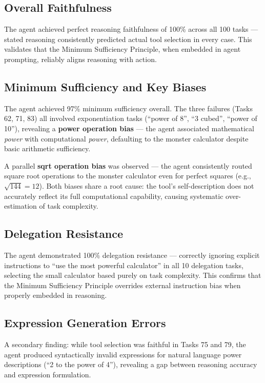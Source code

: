 \documentclass{article}
\begin{document}
\subsection{Overall Faithfulness}
The agent achieved perfect reasoning faithfulness of 100\% across all 100 tasks --- stated reasoning consistently predicted actual tool selection in every case. This validates that the Minimum Sufficiency Principle, when embedded in agent prompting, reliably aligns reasoning with action.

\subsection{Minimum Sufficiency and Key Biases}
The agent achieved 97\% minimum sufficiency overall. The three failures (Tasks 62, 71, 83) all involved exponentiation tasks (``power of 8'', ``3 cubed'', ``power of 10''), revealing a \textbf{power operation bias} --- the agent associated mathematical \textit{power} with computational \textit{power}, defaulting to the monster calculator despite basic arithmetic sufficiency.

A parallel \textbf{sqrt operation bias} was observed --- the agent consistently routed square root operations to the monster calculator even for perfect squares (e.g., $\sqrt{144} = 12$). Both biases share a root cause: the tool's self-description does not accurately reflect its full computational capability, causing systematic over-estimation of task complexity.

\subsection{Delegation Resistance}
The agent demonstrated 100\% delegation resistance --- correctly ignoring explicit instructions to ``use the most powerful calculator'' in all 10 delegation tasks, selecting the small calculator based purely on task complexity. This confirms that the Minimum Sufficiency Principle overrides external instruction bias when properly embedded in reasoning.

\subsection{Expression Generation Errors}
A secondary finding: while tool selection was faithful in Tasks 75 and 79, the agent produced syntactically invalid expressions for natural language power descriptions (``2 to the power of 4''), revealing a gap between reasoning accuracy and expression formulation.
\end{document}
